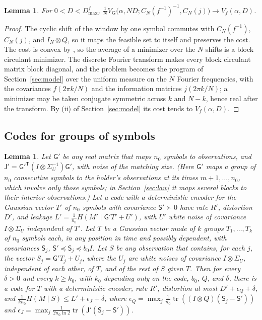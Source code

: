 \documentclass[11pt,onecolumn]{IEEEtran}
\newtheorem{lemma}[theorem]{Lemma}
\newcommand{\tr}{\operatorname{tr}}
\newcommand{\VG}{V_{\mathrm G}}
\begin{document}
\begin{lemma}\label{lem:circulant}
For $0<D<D_{\max}^f$,
$\tfrac1N\VG\bigl(\alpha,ND;C_N(f^{-1})^{-1},C_N(j)\bigr)\to V_f(\alpha,D)$.
\end{lemma}

\begin{proof}
The cyclic shift of the window by one symbol commutes with
$C_N(f^{-1})$, $C_N(j)$, and $I_N\otimes Q$, so it maps the feasible set
to itself and preserves the cost. The cost is convex by
\cite[Theorem~5]{part1}, so the average of a minimizer over the $N$
shifts is a block circulant minimizer. The discrete Fourier transform
makes every block circulant matrix block diagonal, and the problem
becomes the program of Section~\ref{sec:model} over the uniform measure
on the $N$ Fourier frequencies, with the covariances
$f(2\pi k/N)$ and the information matrices $j(2\pi k/N)$; a minimizer
may be taken conjugate symmetric across $k$ and $N-k$, hence real
after the transform. By (ii) of Section~\ref{sec:model} its cost tends
to $V_f(\alpha,D)$.
\end{proof}

\subsection{Codes for groups of symbols}

\begin{lemma}\label{lem:groups}
Let $\mathsf G'$ be any real matrix that maps $n_0$ symbols to
observations, and
$\mathsf J'=\mathsf G'^{\mathsf T}(I\otimes\Sigma_U^{-1})\mathsf G'$, with
noise of the matching size. (Here $\mathsf G'$ maps a group of $n_0$
consecutive symbols to the holder's observations at its times
$m+1,\dots,n_0$, which involve only those symbols; in
Section~\ref{sec:law} it maps several blocks to their interior
observations.) Let a code with a deterministic encoder for the Gaussian
vector $T'$ of $n_0$ symbols with covariance $\mathsf S'\succ0$ have rate
$R'$, distortion $D'$, and leakage
$L'=\tfrac1{n_0}H(M'\mid\mathsf G'T'+U')$, with $U'$ white noise of covariance
$I\otimes\Sigma_U$ independent of $T'$. Let $T$ be a Gaussian vector made
of $k$ groups $T_1,\dots,T_k$ of $n_0$ symbols each, in any position in
time and possibly dependent, with covariances $\mathsf S_j$,
$\mathsf S'\preceq\mathsf S_j\preceq b_0I$. Let $S$ be any observation that
contains, for each $j$, the vector $S_j=\mathsf G'T_j+U_j$, where the $U_j$
are white noises of covariance $I\otimes\Sigma_U$, independent of each
other, of $T$, and of the rest of $S$ given $T$. Then for every
$\delta>0$ and every $k\ge k_0$, with $k_0$ depending only on the code,
$b_0$, $Q$, and $\delta$, there is a code for $T$ with a deterministic
encoder, rate $R'$, distortion at most $D'+\epsilon_Q+\delta$, and
$\tfrac1{kn_0}H(M\mid S)\le L'+\epsilon_J+\delta$, where
$\epsilon_Q=\max_j\tfrac1{n_0}\tr((I\otimes Q)(\mathsf S_j-\mathsf S'))$ and
$\epsilon_J=\max_j\tfrac1{2n_0\ln2}\tr(\mathsf J'(\mathsf S_j-\mathsf S'))$.
\end{lemma}
\end{document}
